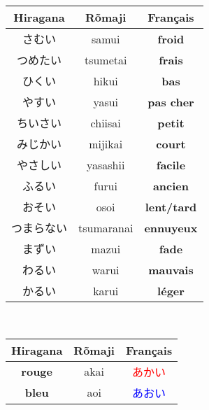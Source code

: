 \documentclass[11pt]{report}
\newenvironment{Japanese}{%
\CJKfamily{min}%
\CJKtilde  
\CJKnospace}{}
\begin{document}
\begin{CJK}{UTF8}{}
\begin{Japanese}
\begin{center}
\begin{multicols}{2}
\begin{tabular}{|c|c|c|}
			\end{tabular}
			\begin{tabular}{|c|c|c|}
				\hline
				\textbf{Hiragana} & \textbf{Rõmaji} & \textbf{Français} \\
				\hline
				さむい & samui & \textbf{froid} \\%
				\hline
				つめたい & tsumetai & \textbf{frais} \\%
				\hline
				ひくい & hikui & \textbf{bas} \\%
				\hline
				やすい & yasui & \textbf{pas cher} \\%
				\hline
				ちいさい & chiisai & \textbf{petit} \\%
				\hline
				みじかい & mijikai & \textbf{court} \\%
				\hline
				やさしい & yasashii & \textbf{facile} \\%
				\hline
				ふるい & furui & \textbf{ancien} \\%
				\hline
				おそい & osoi & \textbf{lent/tard} \\%
				\hline
				つまらない & tsumaranai & \textbf{ennuyeux} \\%
				\hline
				まずい & mazui & \textbf{fade} \\%
				\hline
				わるい & warui & \textbf{mauvais} \\%
				\hline
				かるい & karui & \textbf{léger} \\%
				\hline
			\end{tabular}
		\end{multicols}
		~\\
		\begin{tabular}{|c|c|c|}
			\hline
			\textbf{Hiragana} & \textbf{Rõmaji} & \textbf{Français} \\
			\hline
			\textbf{rouge} & akai & \textcolor{red}{あかい} \\
			\hline
			\textbf{bleu} & aoi & \textcolor{blue}{あおい} \\

\end{tabular}
\end{center}
\end{Japanese}
\end{CJK}
\end{document}
